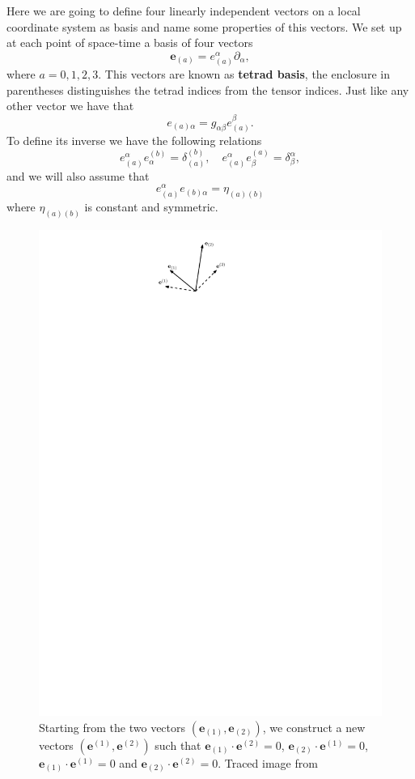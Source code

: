 Here we are going to define four linearly independent vectors on a
local coordinate system as basis and name some properties of this
vectors. We set up at each point of space-time a basis of four vectors
\[
\boldsymbol{e}_{(a)}=e_{(a)}^{\alpha}\partial_{\alpha},
\]
where $a=0,1,2,3$. This vectors are known as \textbf{tetrad basis},
the enclosure in parentheses distinguishes the tetrad indices from
the tensor indices. Just like any other vector we have that
\[
e_{(a)\alpha}=g_{\alpha\beta}e_{(a)}^{\beta}.
\]
To define its inverse we have the following relations
\[
e_{(a)}^{\alpha}e_{\alpha}^{(b)}=\delta_{(a)}^{(b)},\hspace{1em}e_{(a)}^{\alpha}e_{\beta}^{(a)}=\delta_{\beta}^{\alpha},
\]
and we will also assume that
\[
e_{(a)}^{\alpha}e_{(b)\alpha}=\eta_{(a)(b)}
\]
where $\eta_{(a)(b)}$ is constant and symmetric. 
\begin{figure}[h]
\centering{}\includegraphics[scale=1.1]{Kap5/tetrads.pdf}\caption{Starting from the two vectors $\left(\boldsymbol{e}_{(1)},\boldsymbol{e}_{(2)}\right)$,
we construct a new vectors $\left(\boldsymbol{e}^{(1)},\boldsymbol{e}^{(2)}\right)$
such that $\boldsymbol{e}_{(1)}\cdot\boldsymbol{e}^{(2)}=0$, $\boldsymbol{e}_{(2)}\cdot\boldsymbol{e}^{(1)}=0$,
$\boldsymbol{e}_{(1)}\cdot\boldsymbol{e}^{(1)}=0$ and $\boldsymbol{e}_{(2)}\cdot\boldsymbol{e}^{(2)}=0$. Traced image from \cite{Alcubierre}\label{fig:tetrads}}
\end{figure}

